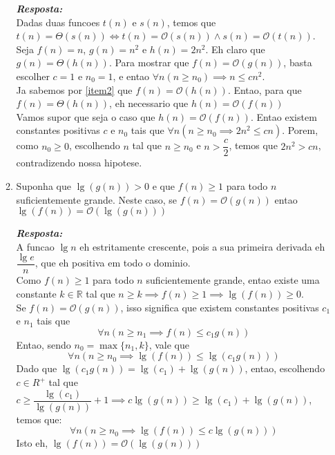 \documentclass{article}
\begin{document}
\begin{enumerate}[itemsep=3ex, label=\textbf{\arabic*}.]
\begin{enumerate}
        \textit{\textbf{Resposta:}}\\
        Dadas duas funcoes $t(n)$ e $s(n)$, temos que
        $t(n) = \Theta(s(n)) \iff t(n) = \mathcal{O}(s(n)) \wedge s(n) = \mathcal{O}(t(n))$.\\
        Seja $f(n) = n$, $g(n) = n^2$ e $h(n) = 2 n^2$. Eh claro que $g(n) = \Theta(h(n))$. Para mostrar que $f(n) = \mathcal{O}(g(n))$, basta escolher $c = 1$ e $n_0 = 1$, e entao
        $\forall n (n \geq n_0) \implies n \leq c n^2$.\\
        Ja sabemos por \ref{item2} que $f(n) = \mathcal{O}(h(n))$. Entao, para que $f(n) = \Theta(h(n))$, eh necessario que $h(n) = \mathcal{O}(f(n))$\\
        Vamos supor que seja o caso que $h(n) = \mathcal{O}(f(n))$. Entao existem constantes positivas $c$ e $n_0$ tais que
        $\forall n (n \geq n_0 \implies 2 n^2 \leq c n)$. Porem, como $n_0 \geq 0$, escolhendo $n$ tal que $n \geq n_0$ e $n > \dfrac{c}{2}$, temos que $2n^2 > cn$, contradizendo nossa hipotese.\\
        
        \item
        Suponha que $\lg(g(n)) > 0$ e que $f(n) \geq 1$ para todo $n$ suficientemente grande.
        Neste caso, se $f(n) = \mathcal{O}(g(n))$ entao $\lg(f(n)) = \mathcal{O}(\lg(g(n)))$
         
        \textit{\textbf{Resposta:}}\\
        A funcao $\lg n$ eh estritamente crescente, pois a sua primeira derivada eh $\dfrac{\lg e}{n}$, que eh positiva em todo o dominio.\\
        Como $f(n) \geq 1$ para todo $n$ suficientemente grande, entao existe uma constante $k \in \mathbb{R}$ tal que $n \geq k \implies f(n) \geq 1 \implies \lg (f(n)) \geq 0$.\\
        Se $f(n) = \mathcal{O}(g(n))$, isso significa que existem constantes positivas $c_1$ e $n_1$ tais que
        $$
        \forall n (n \geq n_1 \implies f(n) \leq c_1 g(n))
        $$
        Entao, sendo $n_0 = \max\{n_1, k\}$, vale que
        $$
        \forall n (n \geq n_0 \implies \lg(f(n)) \leq \lg (c_1 g(n)))
        $$
        Dado que $\lg (c_1 g(n)) = \lg (c_1) + \lg (g(n))$, entao, escolhendo $c \in R^+$ tal que
        $c \geq \dfrac{\lg (c_1)}{\lg (g(n))} + 1 \implies
        c \lg(g(n)) \geq \lg (c_1) + \lg (g(n))$, temos que:
        $$
        \forall n (n \geq n_0 \implies \lg (f(n)) \leq c \lg (g(n)))
        $$
        Isto eh, $\lg (f(n)) = \mathcal{O}(\lg (g(n)))$\\
        
        
    \end{enumerate}

\end{enumerate}
\end{document}
